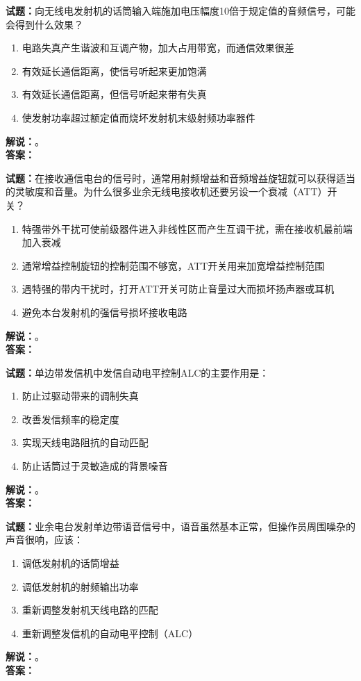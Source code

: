 \documentclass{ctexbook}
\begin{document}
\bigskip

\noindent\textbf{试题：}向无线电发射机的话筒输入端施加电压幅度10倍于规定值的音频信号，可能会得到什么效果？
\begin{enumerate}[leftmargin=3em]
  \item 电路失真产生谐波和互调产物，加大占用带宽，而通信效果很差
  \item 有效延长通信距离，使信号听起来更加饱满
  \item 有效延长通信距离，但信号听起来带有失真
  \item 使发射功率超过额定值而烧坏发射机末级射频功率器件
\end{enumerate}
\noindent\textbf{解说：}\textbf{}。\\\noindent\textbf{答案：}

\bigskip

\noindent\textbf{试题：}在接收通信电台的信号时，通常用射频增益和音频增益旋钮就可以获得适当的灵敏度和音量。为什么很多业余无线电接收机还要另设一个衰减（ATT）开关？
\begin{enumerate}[leftmargin=3em]
  \item 特强带外干扰可使前级器件进入非线性区而产生互调干扰，需在接收机最前端加入衰减
  \item 通常增益控制旋钮的控制范围不够宽，ATT开关用来加宽增益控制范围
  \item 遇特强的带内干扰时，打开ATT开关可防止音量过大而损坏扬声器或耳机
  \item 避免本台发射机的强信号损坏接收电路
\end{enumerate}
\noindent\textbf{解说：}\textbf{}。\\\noindent\textbf{答案：}

\bigskip

\noindent\textbf{试题：}单边带发信机中发信自动电平控制ALC的主要作用是：
\begin{enumerate}[leftmargin=3em]
  \item 防止过驱动带来的调制失真
  \item 改善发信频率的稳定度
  \item 实现天线电路阻抗的自动匹配
  \item 防止话筒过于灵敏造成的背景噪音
\end{enumerate}
\noindent\textbf{解说：}\textbf{}。\\\noindent\textbf{答案：}

\bigskip

\noindent\textbf{试题：}业余电台发射单边带语音信号中，语音虽然基本正常，但操作员周围噪杂的声音很响，应该：
\begin{enumerate}[leftmargin=3em]
  \item 调低发射机的话筒增益
  \item 调低发射机的射频输出功率
  \item 重新调整发射机天线电路的匹配
  \item 重新调整发信机的自动电平控制（ALC）
\end{enumerate}
\noindent\textbf{解说：}\textbf{}。\\\noindent\textbf{答案：}
\end{document}
